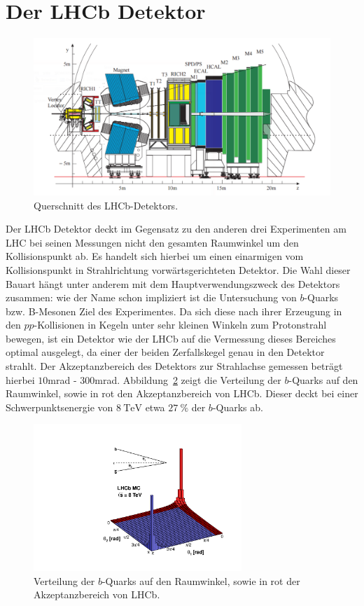 \section{Der LHCb Detektor}
%
\begin{figure}[H]
  \centering
      \includegraphics[width=\textwidth]{Plots/lhcb.pdf}
  \caption{Querschnitt des LHCb-Detektors.\cite{lhcb}}
  \label{fig:lhcb}
\end{figure}
%
Der LHCb Detektor deckt im Gegensatz zu den anderen drei Experimenten am LHC bei seinen Messungen nicht den gesamten Raumwinkel um den Kollisionspunkt ab. Es handelt sich hierbei um einen einarmigen vom Kollisionspunkt in Strahlrichtung vorwärtsgerichteten Detektor. Die Wahl dieser Bauart hängt unter anderem mit dem Hauptverwendungszweck des Detektors zusammen: wie der Name schon impliziert ist die Untersuchung von $b$-Quarks bzw. B-Mesonen Ziel des Experimentes. Da sich diese nach ihrer Erzeugung in den $pp$-Kollisionen in Kegeln unter sehr kleinen Winkeln zum Protonstrahl bewegen, ist ein Detektor wie der LHCb auf die Vermessung dieses Bereiches optimal ausgelegt, da einer der beiden Zerfallskegel genau in den Detektor strahlt. Der Akzeptanzbereich des Detektors zur Strahlachse gemessen beträgt hierbei $10$mrad - $300$mrad. Abbildung~\ref{fig:lhcb_angle} zeigt die Verteilung der $b$-Quarks auf den Raumwinkel, sowie in rot den Akzeptanzbereich von LHCb. Dieser deckt bei einer Schwerpunktsenergie von $\SI{8}{\tera\electronvolt}$ etwa $\SI{27}{\percent}$ der $b$-Quarks ab\cite{rad}.\\
%
\begin{figure}[H]
  \centering
      \includegraphics[width=0.7\textwidth]{Plots/08_rad_acc_scheme_left.pdf}
  \caption{Verteilung der $b$-Quarks auf den Raumwinkel, sowie in rot der Akzeptanzbereich von LHCb\cite{rad_pic}.}
  \label{fig:lhcb_angle}
\end{figure}
